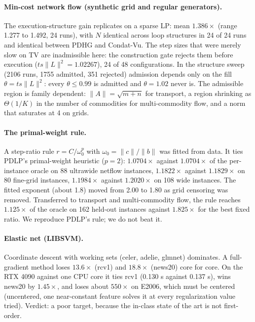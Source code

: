 \documentclass[11pt]{article}
\begin{document}
\paragraph{Min-cost network flow (synthetic grid and regular generators).}

The execution-structure gain replicates on a sparse LP: mean $1.386\times$
(range 1.277 to 1.492, 24 runs), with $N$ identical across loop structures
in 24 of 24 runs and identical between PDHG and Condat-Vu. The step sizes
that were merely slow on TV are inadmissible here: the construction gate
rejects them before execution ($t s \|L\|^2 = 1.02267$), 24 of 48
configurations. In the structure sweep (2106 runs, 1755 admitted, 351
rejected) admission depends only on the fill $\theta = t s \|L\|^2$: every
$\theta\le0.99$ is admitted and $\theta=1.02$ never is. The admissible
region is family dependent: $\|A\|=\sqrt{m+n}$ for transport, a region
shrinking as $\Theta(1/K)$ in the number of commodities for multi-commodity
flow, and a norm that saturates at 4 on grids.

\paragraph{The primal-weight rule.}
 A step-ratio rule
$r = C/\omega_0^p$ with $\omega_0 = \|c\|/\|b\|$ was fitted from data. It ties
PDLP's primal-weight heuristic ($p=2$): $1.0704\times$ against $1.0704\times$
of the per-instance oracle on 88 ultrawide netflow instances, $1.1822\times$
against $1.1829\times$ on 80 fine-grid instances, $1.1984\times$ against
$1.2020\times$ on 108 wide instances. The fitted exponent (about 1.8) moved
from 2.00 to 1.80 as grid censoring was removed. Transferred to transport and
multi-commodity flow, the rule reaches $1.125\times$ of the oracle on 162
held-out instances against $1.825\times$ for the best fixed ratio. We
reproduce PDLP's rule; we do not beat it.

\paragraph{Elastic net (LIBSVM).}

Coordinate descent with working sets (celer, adelie, glmnet) dominates. A
full-gradient method loses $13.6\times$ (rcv1) and $18.8\times$ (news20) core
for core. On the RTX 4090 against one CPU core it ties rcv1 (0.130 s against
0.137 s), wins news20 by $1.45\times$, and loses about $550\times$ on E2006,
which must be centered (uncentered, one near-constant feature solves it at
every regularization value tried). Verdict: a poor target, because the
in-class state of the art is not first-order.
\end{document}
